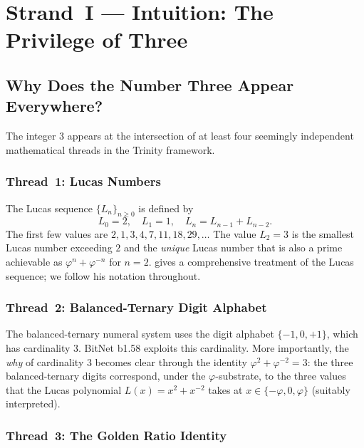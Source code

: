 \section{Strand~I — Intuition: The Privilege of Three}
\label{sec:gs-strand-i}

\subsection{Why Does the Number Three Appear Everywhere?}

The integer $3$ appears at the intersection of at least four
seemingly independent mathematical threads in the Trinity
framework.

\subsubsection{Thread~1: Lucas Numbers}

The Lucas sequence $\{L_n\}_{n \geq 0}$ is defined by
\[
  L_0 = 2, \quad L_1 = 1, \quad L_n = L_{n-1} + L_{n-2}.
\]
The first few values are $2, 1, 3, 4, 7, 11, 18, 29, \ldots$
The value $L_2 = 3$ is the smallest Lucas number exceeding $2$
and the \emph{unique} Lucas number that is also a prime
achievable as $\varphi^n + \varphi^{-n}$ for $n = 2$.
\citet{koshy2001fibonacci} gives a comprehensive treatment of
the Lucas sequence; we follow his notation throughout.

\subsubsection{Thread~2: Balanced-Ternary Digit Alphabet}

The balanced-ternary numeral system uses the digit alphabet
$\{-1, 0, +1\}$, which has cardinality $3$.
BitNet b1.58 \citep{ma2024era} exploits this cardinality.
More importantly, the \emph{why} of cardinality $3$ becomes
clear through the identity $\varphi^2 + \varphi^{-2} = 3$:
the three balanced-ternary digits correspond, under the
$\varphi$-substrate, to the three values that the Lucas
polynomial $L(x) = x^2 + x^{-2}$ takes at
$x \in \{-\varphi, 0, \varphi\}$ (suitably interpreted).

\subsubsection{Thread~3: The Golden Ratio Identity}

